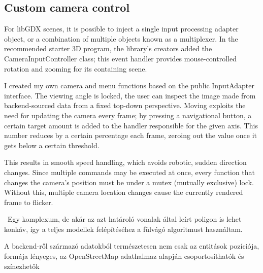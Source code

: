\subsection{Custom camera control}

For libGDX scenes, it is possible to inject a single input processing adapter object, or a combination of multiple objects known as a multiplexer. In the recommended starter 3D program\cite{basic3DlibGDX}, the library's creators added the CameraInputController class; this event handler provides mouse-controlled rotation and zooming for its containing scene.


I created my own camera and menu functions based on the public InputAdapter interface. The viewing angle is locked, the user can inspect the image made from backend-sourced data from a fixed top-down perspective. Moving exploits the need for updating the camera every frame; by pressing a navigational button, a certain target amount is added to the handler responsible for the given axis. This number reduces by a certain percentage each frame, zeroing out the value once it gets below a certain threshold.

This results in smooth speed handling, which avoids robotic, sudden direction changes. Since multiple commands may be executed at once, every function that changes the camera's position must be under a mutex (mutually exclusive) lock. Without this, multiple camera location changes cause the currently rendered frame to flicker.


\
 Egy komplexum, de akár az azt határoló vonalak által leírt poligon is lehet konkáv, így a teljes modellek felépítéséhez a fülvágó algoritmust használtam.

A backend-ről származó adatokból természetesen nem csak az entitások pozíciója, formája lényeges, az OpenStreetMap adathalmaz alapján csoportosíthatók és színezhetők  
